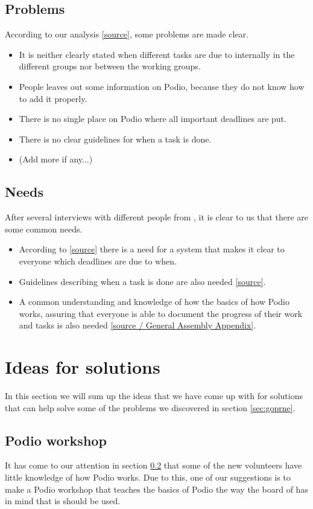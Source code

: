 \subsection{Problems}
\label{subsec:problems}
According to our analysis \ref{source}, some problems are made clear.
\begin{itemize}
    \item It is neither clearly stated when different tasks are due to
    internally in the different groups nor between the working groups.
    \item People leaves out some information on Podio, because they do not know
    how to add it properly.
    \item There is no single place on Podio where all important deadlines are
    put.
    \item There is no clear guidelines for when a task is done.
    \item (Add more if any...)
\end{itemize}

\subsection{Needs}
\label{subsec:needs}
After several interviews with different people from \mil, it is clear to us that
there are some common needs.
\begin{itemize}
    \item According to \ref{source} there is a need for a system that makes it
    clear to everyone which deadlines are due to when.
    \item Guidelines describing when a task is done are also needed
    \ref{source}.
    \item A common understanding and knowledge of how the basics of how Podio
    works, assuring that everyone is able to document the progress of their work
    and tasks is also needed \ref{source / General Assembly Appendix}.
\end{itemize}

\section{Ideas for solutions}
In this section we will sum up the ideas that we have come up with for solutions
that can help solve some of the problems we discovered in section \ref{sec:goprne}.

\subsection{Podio workshop}
It has come to our attention in section \ref{subsec:needs} that
some of the new volunteers have little knowledge of how Podio works. Due to
this, one of our suggestions is to make a Podio workshop that teaches the basics
of Podio the way the board of \mil has in mind that is should be used.

